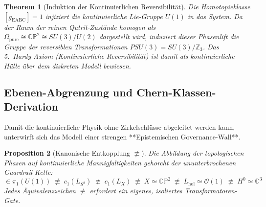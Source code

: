 \documentclass[11pt,a4paper]{article}
\newtheorem{theorem}{Theorem}[section]
\newtheorem{proposition}[theorem]{Proposition}
\begin{document}
\begin{theorem}[Induktion der Kontinuierlichen Reversibilität]
Die Homotopieklasse $[g_{\text{EABC}}] = 1$ injiziert die kontinuierliche Lie-Gruppe $U(1)$ in das System. Da der Raum der reinen Qutrit-Zustände homogen als $\Omega_{\text{pure}} \cong \mathbb{CP}^2 \cong SU(3)/U(2)$ dargestellt wird, induziert dieser Phasenlift die Gruppe der reversiblen Transformationen $PSU(3) = SU(3)/\mathbb{Z}_3$. Das 5.\ Hardy-Axiom (Kontinuierliche Reversibilität) ist damit als kontinuierliche Hülle über dem diskreten Modell bewiesen.
\end{theorem}

\subsection{Ebenen-Abgrenzung und Chern-Klassen-Derivation}

Damit die kontinuierliche Physik ohne Zirkelschlüsse abgeleitet werden kann, unterwirft sich das Modell einer strengen **Epistemischen Governance-Wall**.

\begin{proposition}[Kanonische Entkopplung $\not\equiv$]
Die Abbildung der topologischen Phasen auf kontinuierliche Mannigfaltigkeiten gehorcht der ununterbrochenen Guardrail-Kette:
\begin{equation}
[g] \in \pi_1(U(1)) \;\not\equiv\; c_1(L_{S^2}) \;\not\equiv\; c_1(L_X) \;\not\equiv\; X \simeq \mathbb{CP}^2 \;\not\equiv\; L_{\text{hol}} \simeq \mathcal{O}(1) \;\not\equiv\; H^0 \simeq \mathbb{C}^3
\end{equation}
Jedes Äquivalenzzeichen $\not\equiv$ erfordert ein eigenes, isoliertes Transformatoren-Gate.
\end{proposition}
\end{document}
